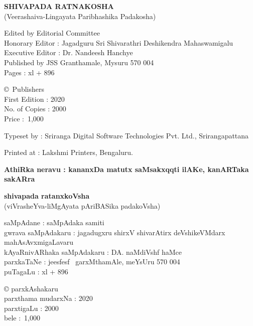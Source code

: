 \thispagestyle{empty}
\noindent
{\rm\sf\bfseries SHIVAPADA RATNAKOSHA}\\[5pt]
{\rm (Veerashaiva-Lingayata Paribhashika Padakosha)} 

\noindent
{\rm Edited by Editorial Committee}\\
{\rm Honorary Editor : Jagadguru Sri Shivarathri Deshikendra Mahaswamigalu}\\
{\rm Executive Editor : Dr. Nandeesh Hanchye}\\
{\rm Published by JSS Granthamale, Mysuru 570 004}\\[8pt]
{\rm Pages : xl + 896}

\vspace{1cm}

\noindent
{\rm \copyright \ Publishers}\\[7pt]
{\rm First Edition : 2020}\\[7pt]
{\rm No. of Copies : 2000}\\[7pt]
{\rm Price : \rupee\,1,000}

\bigskip

\noindent
{\rm Typeset by : Sriranga Digital Software Technologies Pvt. Ltd., Srirangapattana}

\medskip

\noindent
{\rm Printed at : Lakshmi Printers, Bengaluru.}

\vfill

\noindent
{\bf AthiRka neravu : kananxDa matutx saMsakxqqti ilAKe, kanARTaka sakARra}

\vskip 1cm

\noindent
{\bf\large shivapada ratanxkoVsha}\\[5pt]
(viVrasheYva-liMgAyata pAriBASika padakoVsha) 

\smallskip

\noindent
saMpAdane : saMpAdaka samiti\\
gwrava saMpAdakaru : jagadugxru shirxV shivarAtirx deVshikeVMdarx mahAsAvxmigaLavaru\\
kAyaRnivARhaka saMpAdakaru : DA. naMdiVshf haMce\\
parxkaTaNe : je{esf}{esf} \ garxMthamAle, meYsUru 570 004\\[8pt]
puTagaLu : {\rm xl} + 896

\vspace{1cm}

\noindent
{\rm \copyright} parxkAshakaru\\[7pt]
parxthama mudarxNa : 2020\\[7pt]
parxtigaLu : 2000\\[10pt]
bele : \rupee\,1,000

